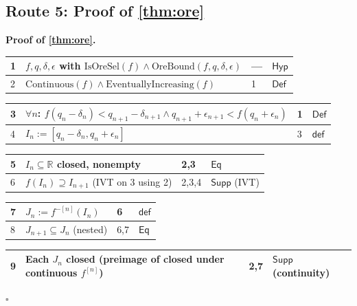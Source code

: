 \documentclass[11pt,reqno]{amsart}
\theoremstyle{blueplain}
\renewcommand{\qedsymbol}{\textcolor{proofqed}{\ensuremath{\square}}}
\renewenvironment{proof}[1][Proof]{\par\noindent\textbf{\textcolor{proofhead}{#1.}}\par\nobreak}{\par\nobreak\hfill\qedsymbol}
\numberwithin{equation}{section}
\begin{document}
\subsection{Route 5: Proof of \cref{thm:ore}}

\begin{proof}[\textbf{Proof of \cref{thm:ore}}]
\label{proof:ore}
{\scriptsize
\begin{tabular}{|m{0.7cm}|m{12cm}|m{1.4cm}|m{2.5cm}|}
\hline
1 & $f,q,\delta,\epsilon$ with $\mathrm{IsOreSel}(f)\wedge\mathrm{OreBound}(f,q,\delta,\epsilon)$ & --- & $\mathsf{Hyp}$ \\ \hline
2 & $\mathrm{Continuous}(f)\wedge\mathrm{EventuallyIncreasing}(f)$ & 1 & $\mathsf{Def}$ \\
\end{tabular}%
\noindent \newline
\noindent
\begin{tabular}{|m{0.7cm}|m{12cm}|m{1.4cm}|m{2.5cm}|}
\hline
3 & $\forall n$: $f(q_n-\delta_n)<q_{n+1}-\delta_{n+1}\wedge q_{n+1}+\epsilon_{n+1}<f(q_n+\epsilon_n)$ & 1 & $\mathsf{Def}$ \\ \hline
4 & $I_n:=[q_n-\delta_n,q_n+\epsilon_n]$ & 3 & $\mathsf{def}$ \\
\end{tabular}%
\noindent \newline
\noindent
\begin{tabular}{|m{0.7cm}|m{12cm}|m{1.4cm}|m{2.5cm}|}
\hline
5 & $I_n\subseteq\mathbb{R}$ closed, nonempty & 2,3 & $\mathsf{Eq}$ \\ \hline
6 & $f(I_n)\supseteq I_{n+1}$ (IVT on 3 using 2) & 2,3,4 & $\mathsf{Supp}$ (IVT) \\
\end{tabular}%
\noindent \newline
\noindent
\begin{tabular}{|m{0.7cm}|m{12cm}|m{1.4cm}|m{2.5cm}|}
\hline
7 & $J_n:=f^{-[n]}(I_n)$ & 6 & $\mathsf{def}$ \\ \hline
8 & $J_{n+1}\subseteq J_n$ (nested) & 6,7 & $\mathsf{Eq}$ \\
\end{tabular}%
\noindent \newline
\noindent
\begin{tabular}{|m{0.7cm}|m{12cm}|m{1.4cm}|m{2.5cm}|}
\hline
9 & Each $J_n$ closed (preimage of closed under continuous $f^{[n]}$) & 2,7 & $\mathsf{Supp}$ (continuity) \\ \hline

\end{tabular}}
\end{proof}
\end{document}
